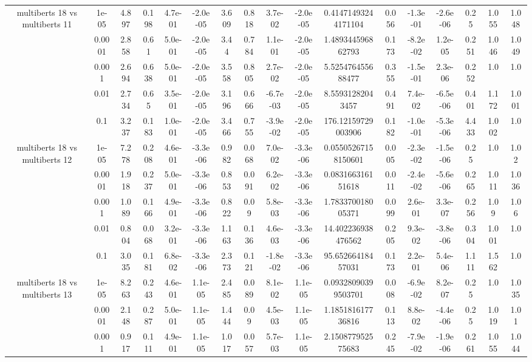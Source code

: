 \begin{tabular}{|c|c|c|c|c|c|c|c|c|c|c|c|c|c|c|c|c|}
\hline
\multirow{5}{*}{multiberts 18 vs multiberts 11} & 1e-05 & 4.897 & 0.198 & 4.7e-01 & -2.0e-05 & 3.609 & 0.818 & 3.7e-02 & -2.0e-05 & 0.41471493244171104 & 0.056 & -1.3e-01 & -2.6e-06 & 0.25 & 1.055 & 1.048 \\
 & 0.0001 & 2.858 & 0.61 & 5.0e-01 & -2.0e-05 & 3.44 & 0.784 & 1.1e-01 & -2.0e-05 & 1.489344596862793 & 0.173 & -8.2e-02 & 1.2e-05 & 0.251 & 1.046 & 1.049 \\
 & 0.001 & 2.694 & 0.638 & 5.0e-01 & -2.0e-05 & 3.558 & 0.805 & 2.7e-02 & -2.0e-05 & 5.525476455688477 & 0.355 & -1.5e-01 & 2.3e-06 & 0.252 & 1.0 & 1.0 \\
 & 0.01 & 2.734 & 0.65 & 3.5e-01 & -2.0e-05 & 3.196 & 0.666 & -6.7e-03 & -2.0e-05 & 8.55931282043457 & 0.491 & 7.4e-02 & -6.5e-06 & 0.401 & 1.172 & 1.001 \\
 & 0.1 & 3.237 & 0.183 & 1.0e-01 & -2.0e-05 & 3.466 & 0.755 & -3.9e-02 & -2.0e-05 & 176.12159729003906 & 0.182 & -1.0e-01 & -5.3e-06 & 4.433 & 1.002 & 1.0 \\
\hline
\multirow{5}{*}{multiberts 18 vs multiberts 12} & 1e-05 & 7.278 & 0.208 & 4.6e-01 & -3.3e-06 & 0.982 & 0.068 & 7.0e-02 & -3.3e-06 & 0.05505267158150601 & 0.005 & -2.3e-02 & -1.5e-06 & 0.25 & 1.0 & 1.02 \\
 & 0.0001 & 1.918 & 0.237 & 5.0e-01 & -3.3e-06 & 0.853 & 0.091 & 6.2e-02 & -3.3e-06 & 0.083166316151618 & 0.011 & -2.4e-02 & -5.6e-06 & 0.265 & 1.011 & 1.036 \\
 & 0.001 & 1.089 & 0.166 & 4.9e-01 & -3.3e-06 & 0.822 & 0.09 & 5.8e-03 & -3.3e-06 & 1.783370018005371 & 0.099 & 2.6e-01 & 3.3e-07 & 0.256 & 1.09 & 1.06 \\
 & 0.01 & 0.804 & 0.068 & 3.2e-01 & -3.3e-06 & 1.163 & 0.136 & 4.6e-03 & -3.3e-06 & 14.402236938476562 & 0.205 & 9.3e-02 & -3.8e-06 & 0.304 & 1.001 & 1.0 \\
 & 0.1 & 3.035 & 0.181 & 6.8e-02 & -3.3e-06 & 2.373 & 0.121 & -1.8e-02 & -3.3e-06 & 95.65266418457031 & 0.173 & 2.2e-01 & 5.4e-06 & 1.111 & 1.562 & 1.0 \\
\hline
\multirow{5}{*}{multiberts 18 vs multiberts 13} & 1e-05 & 8.263 & 0.243 & 4.6e-01 & 1.1e-05 & 2.485 & 0.089 & 8.1e-02 & 1.1e-05 & 0.09328090399503701 & 0.008 & -6.9e-02 & 8.2e-07 & 0.25 & 1.0 & 1.035 \\
 & 0.0001 & 2.148 & 0.287 & 5.0e-01 & 1.1e-05 & 1.444 & 0.09 & 4.5e-03 & 1.1e-05 & 1.185181617736816 & 0.113 & 8.8e-02 & -4.4e-06 & 0.25 & 1.019 & 1.01 \\
 & 0.001 & 0.917 & 0.111 & 4.9e-01 & 1.1e-05 & 1.017 & 0.057 & 5.7e-03 & 1.1e-05 & 2.150877952575683 & 0.245 & -7.9e-02 & -1.9e-06 & 0.261 & 1.055 & 1.044 \\

\end{tabular}
